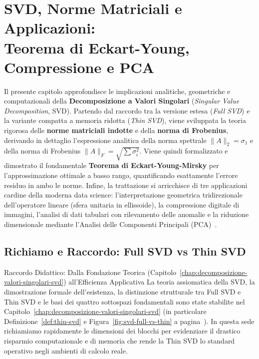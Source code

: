 \chapter[SVD, Norme Matriciali e Applicazioni]{SVD, Norme Matriciali e Applicazioni:\\Teorema di Eckart-Young, Compressione e PCA}
\label{chap:svd-norme-matriciali-applicazioni}

Il presente capitolo approfondisce le implicazioni analitiche, geometriche e computazionali della \textbf{Decomposizione a Valori Singolari} (\textit{Singular Value Decomposition}, SVD). Partendo dal raccordo tra la versione estesa (\textit{Full SVD}) e la variante compatta a memoria ridotta (\textit{Thin SVD}), viene sviluppata la teoria rigorosa delle \textbf{norme matriciali indotte} e della \textbf{norma di Frobenius}, derivando in dettaglio l'espressione analitica della norma spettrale $\|A\|_2 = \sigma_1$ e della norma di Frobenius $\|A\|_F = \sqrt{\sum \sigma_i^2}$. Viene quindi formalizzato e dimostrato il fondamentale \textbf{Teorema di Eckart-Young-Mirsky} per l'approssimazione ottimale a basso rango, quantificando esattamente l'errore residuo in ambo le norme. Infine, la trattazione si arricchisce di tre applicazioni cardine della moderna data science: l'interpretazione geometrica tridirezionale dell'operatore lineare (sfera unitaria in ellissoide), la compressione digitale di immagini, l'analisi di dati tabulari con rilevamento delle anomalie e la riduzione dimensionale mediante l'Analisi delle Componenti Principali (PCA)~\cite{golub2013matrix,trefethen1997numerical,strang2019linear}.

\FloatBarrier
\section{Richiamo e Raccordo: Full SVD vs Thin SVD}
\label{sec:svd-richiamo-full-thin}

\begin{noteblock}{Raccordo Didattico: Dalla Fondazione Teorica (Capitolo~\ref{chap:decomposizione-valori-singolari-svd}) all'Efficienza Applicativa}
La teoria assiomatica della SVD, la dimostrazione formale dell'esistenza, la distinzione strutturale tra Full SVD e Thin SVD e le basi dei quattro sottospazi fondamentali sono state stabilite nel Capitolo~\ref{chap:decomposizione-valori-singolari-svd} (in particolare Definizione~\ref{def:thin-svd} e Figura~\ref{fig:svd-full-vs-thin} a pagina~\pageref{def:thin-svd}).
In questa sede richiamiamo rapidamente le dimensioni dei blocchi per evidenziare il drastico risparmio computazionale e di memoria che rende la Thin SVD lo standard operativo negli ambienti di calcolo reale.
\end{noteblock}

